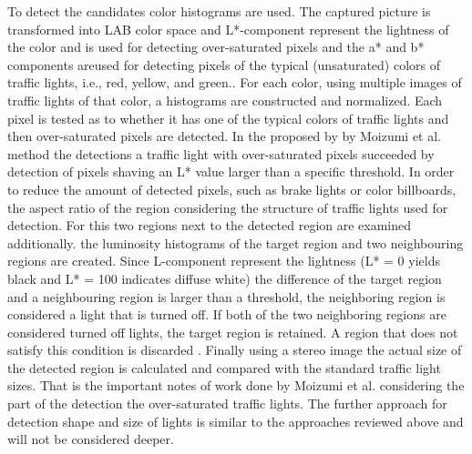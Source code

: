 \documentclass[letterpaper, 10 pt, conference]{ieeeconf} %
\begin{document}
To detect the candidates color histograms are used. The captured picture is transformed into LAB color space and L*-component represent the lightness of the color  and is used for detecting over-saturated pixels and the a* and b* components areused for detecting pixels of the typical (unsaturated) colors of traffic lights, i.e., red, yellow, and green.\cite{c3}. For each color, using multiple images of traffic lights of that color, a histograms are constructed and normalized. Each pixel is tested as to whether it has one of the typical colors of traffic lights and then over-saturated pixels are detected. In the proposed by by Moizumi et al. method the detections a traffic light with over-saturated pixels succeeded by detection of pixels shaving an L* value larger than a specific threshold. In order to reduce the amount of detected pixels, such as brake lights or color billboards, the aspect ratio of the region considering the structure of traffic lights used for detection. For this two regions next to the detected region are examined additionally. the luminosity histograms of the target region and two neighbouring regions are created. Since L-component represent the lightness (L* = 0 yields black and L* = 100 indicates diffuse white) the difference of the target region and a neighbouring region is larger than a threshold, the neighboring region is considered a light that is turned off. If both of the two neighboring regions are considered turned off lights, the target region is retained. A region that does not satisfy this condition is discarded \cite{c3}. Finally using a stereo image the actual size of the detected region is calculated and compared with the standard traffic light sizes. That is the important notes of work done by Moizumi et al. considering the part of the detection the over-saturated traffic lights. The further approach for detection shape and size of lights is similar to the approaches reviewed above and will not be considered deeper. 
\end{document}

